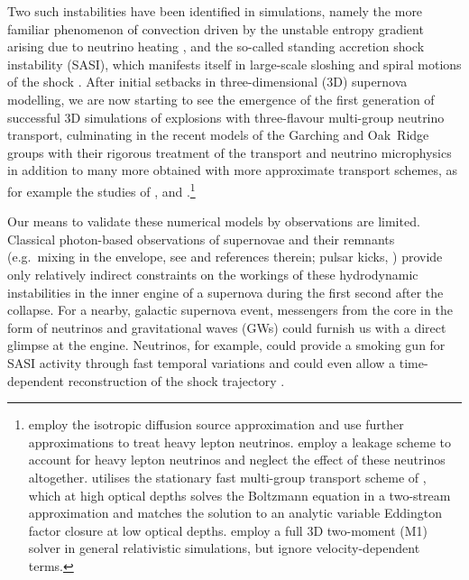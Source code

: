 Two such instabilities have been identified in simulations,
namely the more familiar phenomenon of convection driven by the unstable entropy gradient arising due to neutrino heating
\citep{bethe_90,herant_94,burrows_95,janka_96,mueller_97}, and the
so-called standing accretion shock instability (SASI), which manifests
itself in large-scale sloshing and spiral motions of the shock
\citep{blondin_03,blondin_06,foglizzo_07,ohnishi_06,ohnishi_08,scheck_08,guilet_12,foglizzo_15}.
After initial setbacks in three-dimensional (3D) supernova modelling,
we are now starting to see the emergence of the first generation
of successful 3D simulations of explosions with three-flavour
multi-group neutrino transport, culminating in the recent models
of the Garching and Oak~Ridge groups
\citep{melson_15a,melson_15b,lentz_15} with their rigorous treatment
of the transport and neutrino microphysics in addition to many more
obtained with more approximate transport schemes,
as for example the studies of \citet{takiwaki_12,takiwaki_14}, 
\citet{mueller_15b} and \citet{roberts_16}.\footnote{
\citet{takiwaki_12,takiwaki_14} employ the isotropic diffusion source 
approximation \citep{liebendoerfer_09}
and use further approximations to treat heavy lepton neutrinos.
\cite{takiwaki_14} employ a leakage scheme to account for heavy lepton
neutrinos and \cite{takiwaki_12} neglect the effect of these neutrinos 
altogether. \cite{mueller_15b} utilises the stationary fast multi-group 
transport scheme of \cite{mueller_15a}, which at high optical depths 
solves the Boltzmann equation in a two-stream approximation and
matches the solution to an analytic variable 
Eddington factor closure at low optical depths.
\citet{roberts_16} employ a full 3D two-moment (M1) solver in 
general relativistic simulations, but ignore velocity-dependent
terms.}

Our means to validate these numerical models by observations are
limited. Classical photon-based observations of supernovae and their
remnants (e.g.\ mixing in the envelope, see
\citealp{wongwathanarat_15} and references therein; pulsar kicks,
\citealp{scheck_06,wongwathanarat_10b,wongwathanarat_13,nordhaus_12}) provide only
relatively indirect constraints on the workings of these hydrodynamic
instabilities in the inner engine of a supernova during the first
second after the collapse.  For a nearby, galactic supernova event,
messengers from the core in the form of neutrinos and gravitational waves (GWs) 
could furnish us with a direct glimpse at the engine. Neutrinos,
for example, could provide a smoking gun for SASI activity through
fast temporal variations \citep{marek_08,lund_10,brandt_11,tamborra_13,tamborra_14b,mueller_14} and
could even allow a time-dependent reconstruction of the shock trajectory
\citep{mueller_14}.

